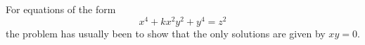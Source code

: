 \begin{proposition}\label{eq:149}
    For equations of the form
\[
    x^4+kx^2y^2+y^4=z^2
\]
    the problem has usually been to show that the only solutions are given by $xy=0$.
\end{proposition}
